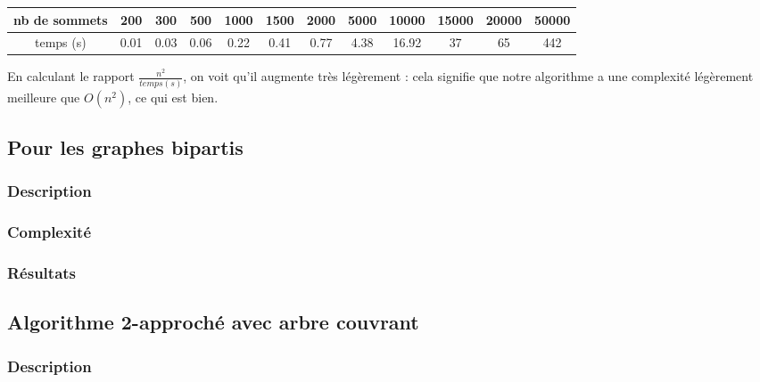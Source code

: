 \documentclass[a4paper,10pt]{article}
\begin{document}
\bigskip
\begin{tabular}{|c|c|c|c|c|c|c|c|c|c|c|c|}
	\hline 
	nb de sommets & 200 & 300 & 500 & 1000 & 1500 & 2000 & 5000 & 10000 & 15000 & 20000 & 50000 \\
	\hline
	temps (s) & 0.01 & 0.03 & 0.06 & 0.22 & 0.41 & 0.77 & 4.38 & 16.92 & 37 & 65 & 442 \\
	\hline
\end{tabular}

En calculant le rapport $\frac{n^2}{temps(s)}$, on voit qu'il augmente très légèrement : cela signifie que notre algorithme a une complexité légèrement meilleure que $O(n^2)$, ce qui est bien.

\subsection{Pour les graphes bipartis}

\subsubsection{Description}


\subsubsection{Complexité}


\subsubsection{Résultats}


\subsection{Algorithme 2-approché avec arbre couvrant}

\subsubsection{Description}
\end{document}
